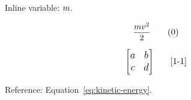 \documentclass{article}
\begin{document}
Inline variable: \({\fontsize{12pt}{14.4pt}\selectfont m}\).

\vspace{0.5\baselineskip}
\begin{equation*}
  {\fontsize{12pt}{14.4pt}\selectfont \frac{mv^2}{2}}
  \tag*{{\fontsize{10.5pt}{12.6pt}\selectfont (\theequation)}}
  \label{eq:kinetic-energy}
\end{equation*}
\vspace{0.5\baselineskip}

\begin{equation*}
  {\fontsize{12pt}{14.4pt}\selectfont \begin{bmatrix}a & b \\ c & d\end{bmatrix}}
  \tag*{{\fontsize{10.5pt}{12.6pt}\selectfont [1-1]}}
  \label{eq:matrix}
\end{equation*}

Reference: Equation~\ref{eq:kinetic-energy}.
\end{document}
